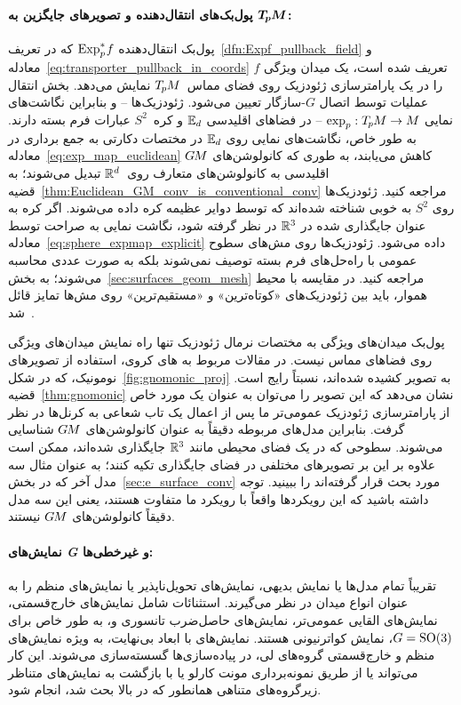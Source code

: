 \paragraph{پول‌بک‌های انتقال‌دهنده و تصویرهای جایگزین به $\boldsymbol{T_{\mkern-1.5mu p}\mkern-.5muM}$:}
پول‌بک انتقال‌دهنده $\operatorname{Exp}^*_p\mkern-2mu f$ که در تعریف~\ref{dfn:Expf_pullback_field} و معادله~\eqref{eq:transporter_pullback_in_coords} تعریف شده است، یک میدان ویژگی $f$ را در یک پارامترسازی ژئودزیک روی فضای مماس~$T_{\mkern-1.5mu p}\mkern-.5muM$ نمایش می‌دهد.
بخش انتقال عملیات توسط اتصال $G$-سازگار تعیین می‌شود.
ژئودزیک‌ها -- و بنابراین نگاشت‌های نمایی $\exp_p: T_{\mkern-1.5mu p}\mkern-.5muM\to M$ -- در فضاهای اقلیدسی $\mathbb{E}_d$ و کره~$S^2$ عبارات فرم بسته دارند.
به طور خاص، نگاشت‌های نمایی روی $\mathbb{E}_d$ در مختصات دکارتی به جمع برداری در معادله~\eqref{eq:exp_map_euclidean} کاهش می‌یابند، به طوری که کانولوشن‌های $G\mkern-1.4muM$ اقلیدسی به کانولوشن‌های متعارف روی~$\mathbb{R}^d$ تبدیل می‌شوند؛ به قضیه~\ref{thm:Euclidean_GM_conv_is_conventional_conv} مراجعه کنید.
ژئودزیک‌ها روی $S^2$ به خوبی شناخته شده‌اند که توسط دوایر عظیمه کره داده می‌شوند.
اگر کره به عنوان جایگذاری شده در $\mathbb{R}^3$ در نظر گرفته شود، نگاشت نمایی به صراحت توسط معادله~\eqref{eq:sphere_expmap_explicit} داده می‌شود.
ژئودزیک‌ها روی مش‌های سطوح عمومی با راه‌حل‌های فرم بسته توصیف نمی‌شوند بلکه به صورت عددی محاسبه می‌شوند؛ به بخش~\ref{sec:surfaces_geom_mesh} مراجعه کنید.
در مقایسه با محیط هموار، باید بین ژئودزیک‌های «کوتاه‌ترین» و «مستقیم‌ترین» روی مش‌ها تمایز قائل شد~\cite{polthier1998straightest}.

پول‌بک میدان‌های ویژگی به مختصات نرمال ژئودزیک تنها راه نمایش میدان‌های ویژگی روی فضاهای مماس نیست.
در مقالات مربوط به \CNN های کروی، استفاده از تصویرهای نومونیک، که در شکل~\ref{fig:gnomonic_proj} به تصویر کشیده شده‌اند، نسبتاً رایج است.
قضیه~\ref{thm:gnomonic} نشان می‌دهد که این تصویر را می‌توان به عنوان یک مورد خاص از پارامترسازی ژئودزیک عمومی‌تر ما پس از اعمال یک تاب شعاعی به کرنل‌ها در نظر گرفت.
بنابراین مدل‌های مربوطه دقیقاً به عنوان کانولوشن‌های $G\mkern-1.4muM$ شناسایی می‌شوند.
سطوحی که در یک فضای محیطی مانند $\mathbb{R}^3$ جایگذاری شده‌اند، ممکن است علاوه بر این بر تصویرهای مختلفی در فضای جایگذاری تکیه کنند؛ به عنوان مثال سه مدل آخر که در بخش~\ref{sec:e_surface_conv} مورد بحث قرار گرفته‌اند را ببینید.
توجه داشته باشید که این رویکردها واقعاً با رویکرد ما متفاوت هستند، یعنی این سه مدل دقیقاً کانولوشن‌های $G\mkern-1.4muM$ نیستند.

\paragraph{نمایش‌های \textit{G} و غیرخطی‌ها:}
تقریباً تمام مدل‌ها یا نمایش بدیهی، نمایش‌های تحویل‌ناپذیر یا نمایش‌های منظم را به عنوان انواع میدان در نظر می‌گیرند.
استثنائات شامل نمایش‌های خارج‌قسمتی، نمایش‌های القایی عمومی‌تر، نمایش‌های حاصل‌ضرب تانسوری و، به طور خاص برای $G=\operatorname{SO}(3)$، نمایش کواترنیونی هستند.
نمایش‌های با ابعاد بی‌نهایت، به ویژه نمایش‌های منظم و خارج‌قسمتی گروه‌های لی، در پیاده‌سازی‌ها گسسته‌سازی می‌شوند.
این کار می‌تواند یا از طریق نمونه‌برداری مونت کارلو یا با بازگشت به نمایش‌های متناظر زیرگروه‌های متناهی همانطور که در بالا بحث شد، انجام شود.


